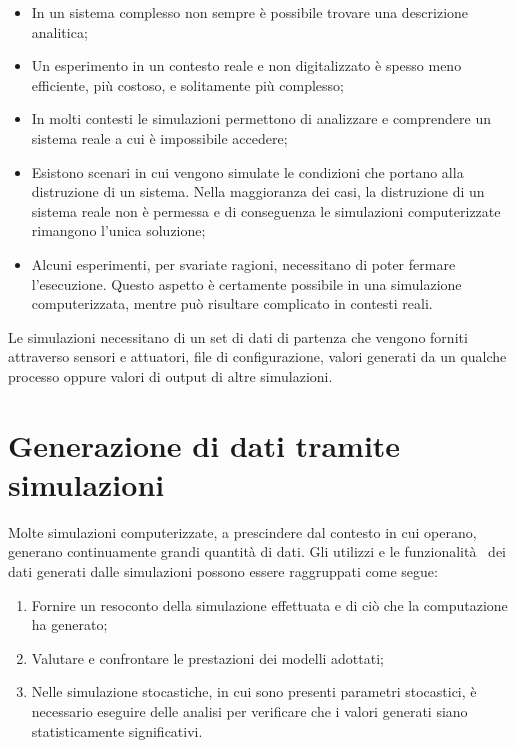 \documentclass[12pt,a4paper,openright,oneside]{book}
\begin{document}
\begin{itemize}
    \item In un sistema complesso non sempre è possibile trovare una descrizione analitica;
    \item Un esperimento in un contesto reale e non digitalizzato è spesso meno efficiente, più costoso, e solitamente più complesso;
    \item In molti contesti le simulazioni permettono di analizzare e comprendere un sistema reale a cui è impossibile accedere;
    \item Esistono scenari in cui vengono simulate le condizioni che portano alla distruzione di un sistema. Nella maggioranza dei casi, la distruzione di un sistema reale non è permessa e di conseguenza le simulazioni computerizzate rimangono l'unica soluzione;
    \item Alcuni esperimenti, per svariate ragioni, necessitano di poter fermare l'esecuzione. Questo aspetto è certamente possibile in una simulazione computerizzata, mentre può risultare complicato in contesti reali.
\end{itemize}

Le simulazioni necessitano di un set di dati di partenza che vengono forniti attraverso sensori e attuatori, file di configurazione, valori generati da un qualche processo oppure valori di output di altre simulazioni. 

\section{Generazione di dati tramite simulazioni}

Molte simulazioni computerizzate, a prescindere dal contesto in cui operano, generano continuamente grandi quantità di dati.
Gli utilizzi e le funzionalità~\cite{Garrido2009} dei dati generati dalle simulazioni possono essere raggruppati come segue:

\begin{enumerate}
    \item Fornire un resoconto della simulazione  effettuata e di ciò che la computazione ha generato;
    \item Valutare e confrontare le prestazioni dei modelli adottati;
    \item Nelle simulazione stocastiche, in cui sono presenti parametri stocastici, è necessario eseguire delle analisi per verificare che i valori generati siano statisticamente significativi.
\end{enumerate}
\end{document}
